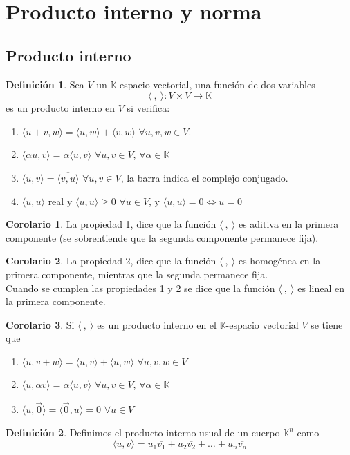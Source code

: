 \documentclass[10pt]{article}
\theoremstyle{definition}
\newtheorem{definition}{Definición}[section]
\newtheorem{corollary}{Corolario}[theorem]
\begin{document}
\section{Producto interno y norma}
\subsection{Producto interno}
\begin{definition}
	Sea $V$ un $\mathbb{K}$-espacio vectorial, una función de dos variables $$\langle \ ,\ \rangle :V\times V\rightarrow \mathbb{K}$$
	es un producto interno en $V$ si verifica:
	\begin{enumerate}
		\item $\langle u+v, w \rangle = \langle u,w \rangle + \langle v,w \rangle$ $\forall u,v,w\in V$.
		\item $\langle\alpha u,v \rangle = \alpha\langle u,v \rangle$ $\forall u,v\in V$, $\forall\alpha\in\mathbb{K}$
		\item $\langle u,v\rangle = \overline{\langle v,u \rangle}$ $\forall u,v\in V$, la barra indica el complejo conjugado.
		\item $\langle u,u \rangle$ real y $\langle u,u \rangle\ge 0$ $\forall u\in V$, y $\langle u,u \rangle =0\Leftrightarrow u=0$
	\end{enumerate}
\end{definition}
\begin{corollary}
	La propiedad 1, dice que la función $\langle \ ,\ \rangle$ es aditiva en la primera componente (se sobrentiende que la segunda componente permanece fija).
\end{corollary}
\begin{corollary}
	La propiedad 2, dice que la función $\langle \ ,\ \rangle$ es homogénea en la primera componente, mientras que la segunda permanece fija.
	\\Cuando se cumplen las propiedades 1 y 2 se dice que la función $\langle \ ,\ \rangle$ es lineal en la primera componente.
\end{corollary}
\begin{corollary}
	Si $\langle \ ,\ \rangle$ es un producto interno en el $\mathbb{K}$-espacio vectorial $V$ se tiene que
	\begin{enumerate}[label=\alph*)]
		\item $\langle u,v+w \rangle = \langle u,v \rangle + \langle u,w \rangle$ $\forall u,v,w\in V$
		\item $\langle u,\alpha v \rangle = \overline{\alpha}\langle u,v\rangle$ $\forall u,v\in V$, $\forall\alpha\in\mathbb{K}$
		\item $\langle u,\vec{0}\rangle =\langle\vec{0} ,u\rangle =0$ $\forall u\in V$
	\end{enumerate}
\end{corollary}
\begin{definition}
	Definimos el producto interno usual de un cuerpo $\mathbb{K}^n$ como $$\langle u,v \rangle = u_1 \overline{v_1} +u_2\overline{v_2}+\dots+u_n\overline{v_n}$$
\end{definition}\newpage
\end{document}
